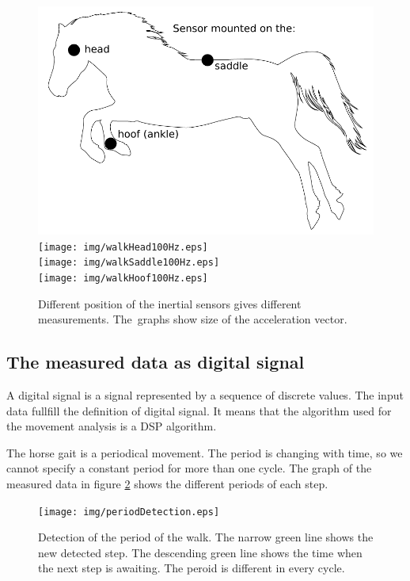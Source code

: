 \begin{figure}
	\centering
	\label{fig:differentSensorPosition}
	\caption{Different position of the inertial sensors gives different measurements. The~graphs show size of the acceleration vector.}
	\includegraphics[scale=0.5]{img/sensorMount.pdf} \\
	\texttt{[image: img/walkHead100Hz.eps]} \\
	\texttt{[image: img/walkSaddle100Hz.eps]} \\
	\texttt{[image: img/walkHoof100Hz.eps]}
\end{figure}

\subsection{The measured data as digital signal}
A digital signal is a signal represented by a sequence of discrete values. \cite{digitalSignalProcessing} The input data fullfill the definition of digital signal. It means that the algorithm used for the movement analysis is a \ac{DSP} algorithm.

The horse gait is a periodical movement. The period is changing with time, so we cannot specify a constant period for more than one cycle. The graph of the measured data in figure \ref{fig:graphPeriodicalMovement} shows the different periods of each step.

\begin{figure}
	\centering
	\label{fig:graphPeriodicalMovement}
	\caption{Detection of the period of the walk. The narrow green line shows the new detected step. The descending green line shows the time when the next step is awaiting. The peroid is different in every cycle.}
	\texttt{[image: img/periodDetection.eps]}
\end{figure}

